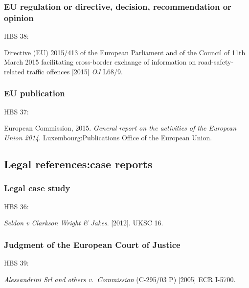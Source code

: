 \subsubsection*{EU regulation or directive, decision, recommendation or opinion}

HBS 38: \cite{eu.dir2015/413}

Directive (EU) 2015/413 of the European Parliament and of the Council of 11th March 2015 facilitating cross-border exchange of information on road-safety-related traffic offences [2015] \emph{OJ} L68/9.




\subsubsection*{EU publication}

HBS 37: \cite{ec2015gra}

European Commission, 2015. \emph{General report on the activities of the European Union 2014}. Luxembourg:\@ Publications Office of the European Union.



\subsection{Legal references:\@ case reports}

\subsubsection*{Legal case study}

HBS 36: \cite{seldon-v-c.w.j2012}

\emph{Seldon v Clarkson Wright \& Jakes}. [2012]. UKSC 16.



\subsubsection*{Judgment of the European Court of Justice}

HBS 39: \cite{srl.etal-v-comm2005}

\emph{Alessandrini Srl and others v.~Commission} (C-295/03 P) [2005] ECR I-5700.


